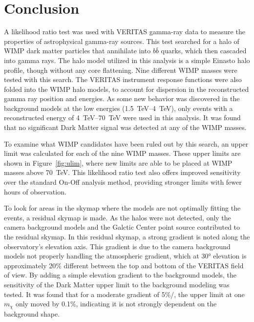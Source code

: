 \cleartooddpage[\thispagestyle{empty}]
\chapter{Conclusion}

A likelihood ratio test was used with VERITAS gamma-ray data to measure the properties of astrophysical gamma-ray sources.
This test searched for a halo of WIMP dark matter particles that annihilate into $b\bar{b}$ quarks, which then cascaded into gamma rays.
The halo model utilized in this analysis is a simple Einasto halo profile, though without any core flattening.
Nine different WIMP masses were tested with this search.
The VERITAS instrument response functions were also folded into the WIMP halo models, to account for dispersion in the reconstructed gamma ray position and energies.
As some new behavior was discovered in the background models at the low energies (\SIrange{1.5}{4}{TeV}), only events with a reconstructed energy of \SIrange{4}{70}{TeV} were used in this analysis.
It was found that no significant Dark Matter signal was detected at any of the WIMP masses.

To examine what WIMP candidates have been ruled out by this search, an upper limit was calculated for each of the nine WIMP masses.
These upper limits are shown in Figure~\ref{fig:ulim}, where new limits are able to be placed at WIMP masses above \SI{70}{TeV}.
This likelihood ratio test also offers improved sensitivity over the standard On-Off analysis method, providing stronger limits with fewer hours of observation.

To look for areas in the skymap where the models are not optimally fitting the events, a residual skymap is made.
As the halos were not detected, only the camera background models and the Galctic Center point source contributed to the residual skymap.
In this residual skymap, a strong gradient is noted along the observatory's elevation axis.
This gradient is due to the camera background models not properly handling the atmospheric gradient, which at \ang{30} elevation is approximately \nicetilde{}20\% different between the top and bottom of the VERITAS field of view.
By adding a simple elevation gradient to the background models, the sensitivity of the Dark Matter upper limit to the background modeling was tested.
It was found that for a moderate gradient of 5\%/\degree{}, the upper limit at one $m_{\chi}$ only moved by 0.1\%, indicating it is not strongly dependent on the background shape.

